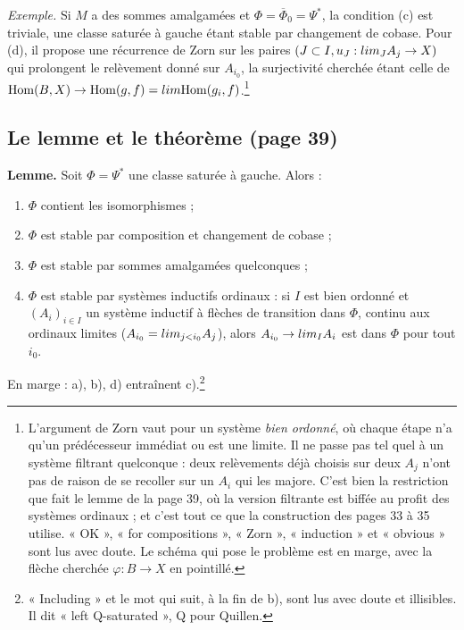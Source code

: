 \documentclass[11pt,a4paper]{article}
\begin{document}

\emph{Exemple.} Si $M$ a des sommes amalgamées et $\Phi = \overline{\Phi}_0 =
\Psi^*$, la condition (c) est triviale, une classe saturée à gauche étant
stable par changement de cobase. Pour (d), il propose une récurrence de Zorn sur
les paires $(J \subset I, u_J : \varinjlim_J A_j \to X)$ qui prolongent le
relèvement donné sur $A_{i_0}$, la surjectivité cherchée étant celle de
$\mathrm{Hom}(B, X) \to \mathrm{Hom}(g, f) = \varprojlim
\mathrm{Hom}(g_i, f)$.\footnote{L'argument de Zorn vaut pour un système
\emph{bien ordonné}, où chaque étape n'a qu'un prédécesseur immédiat ou est
une limite. Il ne passe pas tel quel à un système filtrant quelconque : deux
relèvements déjà choisis sur deux $A_j$ n'ont pas de raison de se recoller sur
un $A_i$ qui les majore. C'est bien la restriction que fait le lemme de la page
39, où la version filtrante est biffée au profit des systèmes ordinaux ; et
c'est tout ce que la construction des pages 33 à 35 utilise. « OK », « for
compositions », « Zorn », « induction » et « obvious » sont lus avec doute.
Le schéma qui pose le problème est en marge, avec la flèche cherchée
$\varphi : B \to X$ en pointillé.}

\subsection*{Le lemme et le théorème (page 39)}

\textbf{Lemme.} Soit $\Phi = \Psi^*$ une classe saturée à gauche. Alors :
\begin{enumerate}
\item[a)] $\Phi$ contient les isomorphismes ;
\item[b)] $\Phi$ est stable par composition et changement de cobase ;
\item[c)] $\Phi$ est stable par sommes amalgamées quelconques ;
\item[d)] $\Phi$ est stable par systèmes inductifs ordinaux : si $I$ est bien
ordonné et $(A_i)_{i \in I}$ un système inductif à flèches de transition dans
$\Phi$, continu aux ordinaux limites ($A_{i_0} = \varinjlim_{j < i_0} A_j$),
alors $A_{i_0} \to \varinjlim_I A_i$ est dans $\Phi$ pour tout $i_0$.
\end{enumerate}
En marge : a), b), d) entraînent c).\footnote{« Including » et le mot qui suit,
à la fin de b), sont lus avec doute et illisibles. Il dit « left
Q-saturated », Q pour Quillen.}
\end{document}
